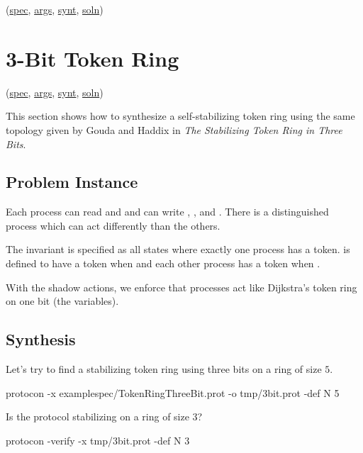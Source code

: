 (\href{\examplespec/TokenRingSuperpos.prot}{spec},
\href{\examplesett/TokenRingSixState.args}{args},
\href{\examplesynt/TokenRingSixSuperpos.prot}{synt},
\href{\examplesoln/TokenRingSixState.prot}{soln})

\section{3-Bit Token Ring}
\label{sec:TokenRingThreeBit}

(\href{\examplespec/TokenRingThreeBit.prot}{spec},
\href{\examplesett/TokenRingThreeBit.args}{args},
\href{\examplesynt/TokenRingThreeBit.prot}{synt},
\href{\examplesoln/TokenRingThreeBit.prot}{soln})

This section shows how to synthesize a self-stabilizing token ring using the same topology given by
Gouda and Haddix in \textit{The Stabilizing Token Ring in Three Bits}.

\subsection{Problem Instance}


Each process can read  and  and can write , , and .
There is a distinguished process  which can act differently than the others.

The invariant is specified as all states where exactly one process has a token.
 is defined to have a token when  and each other  process has a token when .

With the shadow actions, we enforce that processes act like Dijkstra's token ring on one bit (the  variables).

\subsection{Synthesis}

Let's try to find a stabilizing token ring using three bits on a ring of size $5$.
\begin{code}
protocon -x examplespec/TokenRingThreeBit.prot -o tmp/3bit.prot -def N 5
\end{code}

Is the protocol stabilizing on a ring of size $3$?
\begin{code}
protocon -verify -x tmp/3bit.prot -def N 3
\end{code}

